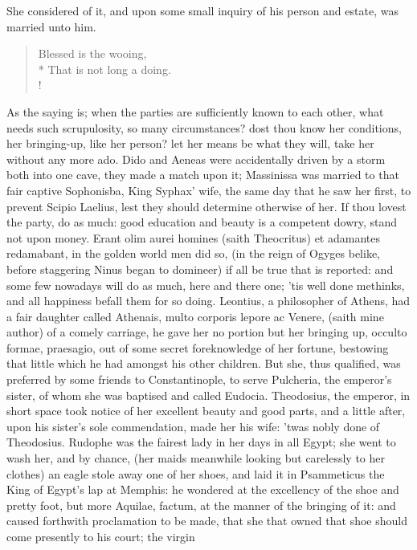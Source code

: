 She considered of it, and upon some small inquiry of his person and
estate, was married unto him.
%
\begin{verse}
Blessed is the wooing,\\*
That is not long a doing.\\!
\end{verse}

As the saying is; when the parties are sufficiently known to each
other, what needs such scrupulosity, so many circumstances? dost thou
know her conditions, her bringing-up, like her person? let her means be
what they will, take her without any more ado. Dido and Aeneas
were accidentally driven by a storm both into one cave, they made a
match upon it; Massinissa was married to that fair captive Sophonisba,
King Syphax' wife, the same day that he saw her first, to prevent
Scipio Laelius, lest they should determine otherwise of her. If thou
lovest the party, do as much: good education and beauty is a competent
dowry, stand not upon money. Erant olim aurei homines (saith
Theocritus) et adamantes redamabant, in the golden world men did so,
(in the reign of Ogyges belike, before staggering Ninus began to
domineer) if all be true that is reported: and some few nowadays will
do as much, here and there one; 'tis well done methinks, and all
happiness befall them for so doing. Leontius, a philosopher of
Athens, had a fair daughter called Athenais, multo corporis lepore ac
Venere, (saith mine author) of a comely carriage, he gave her no
portion but her bringing up, occulto formae, praesagio, out of some
secret foreknowledge of her fortune, bestowing that little which he had
amongst his other children. But she, thus qualified, was preferred by
some friends to Constantinople, to serve Pulcheria, the emperor's
sister, of whom she was baptised and called Eudocia. Theodosius, the
emperor, in short space took notice of her excellent beauty and good
parts, and a little after, upon his sister's sole commendation, made
her his wife: 'twas nobly done of Theodosius. Rudophe was the
fairest lady in her days in all Egypt; she went to wash her, and by
chance, (her maids meanwhile looking but carelessly to her clothes) an
eagle stole away one of her shoes, and laid it in Psammeticus the King
of Egypt's lap at Memphis: he wondered at the excellency of the shoe
and pretty foot, but more Aquilae, factum, at the manner of the
bringing of it: and caused forthwith proclamation to be made, that she
that owned that shoe should come presently to his court; the virgin
